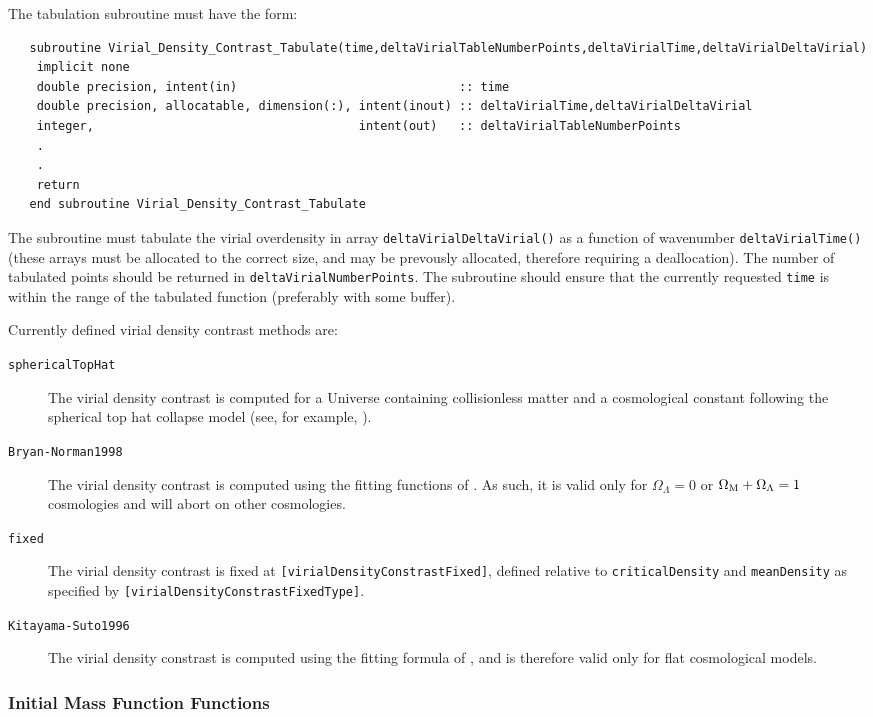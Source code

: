 The tabulation subroutine must have the form:
\begin{verbatim}
   subroutine Virial_Density_Contrast_Tabulate(time,deltaVirialTableNumberPoints,deltaVirialTime,deltaVirialDeltaVirial)
    implicit none
    double precision, intent(in)                               :: time
    double precision, allocatable, dimension(:), intent(inout) :: deltaVirialTime,deltaVirialDeltaVirial
    integer,                                     intent(out)   :: deltaVirialTableNumberPoints
    .
    .
    return
   end subroutine Virial_Density_Contrast_Tabulate
\end{verbatim}
The subroutine must tabulate the virial overdensity in array {\tt deltaVirialDeltaVirial()} as a function of wavenumber {\tt deltaVirialTime()} (these arrays must be allocated to the correct size, and may be prevously allocated, therefore requiring a deallocation). The number of tabulated points should be returned in {\tt deltaVirialNumberPoints}. The subroutine should ensure that the currently requested {\tt time} is within the range of the tabulated function (preferably with some buffer).

Currently defined virial density contrast methods are:
\begin{description}
 \item [{\tt sphericalTopHat}] The virial density contrast is computed for a Universe containing collisionless matter and a cosmological constant following the spherical top hat collapse model (see, for example, \citealt{percival_cosmological_2005}).
 \item [{\tt Bryan-Norman1998}] The virial density contrast is computed using the fitting functions of \cite{bryan_statistical_1998}. As such, it is valid only for $\Omega_\Lambda=0$ or $\Omega_{\rm M}+\Omega_\Lambda=1$ cosmologies and will abort on other cosmologies.
 \item [{\tt fixed}] The virial density contrast is fixed at {\tt [virialDensityConstrastFixed]}, defined relative to {\tt criticalDensity} and {\tt meanDensity} as specified by {\tt [virialDensityConstrastFixedType]}.
 \item [{\tt Kitayama-Suto1996}] The virial density constrast is computed using the fitting formula of \cite{kitayama_semianalytic_1996}, and is therefore valid only for flat cosmological models.
\end{description}

\subsubsection{Initial Mass Function Functions}\label{sec:IMF_functions}

